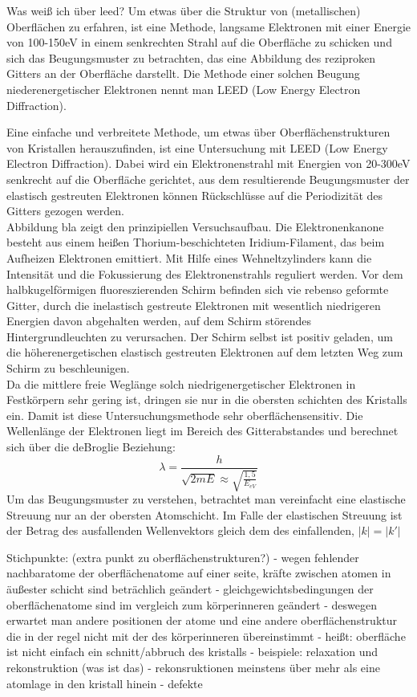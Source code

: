 Was weiß ich über leed?
Um etwas über die Struktur von (metallischen) Oberflächen zu erfahren, ist eine Methode, langsame Elektronen
mit einer Energie von 100-150eV in einem senkrechten Strahl auf die Oberfläche zu schicken und sich das
Beugungsmuster zu betrachten, das eine Abbildung des reziproken Gitters an der Oberfläche darstellt. Die
Methode einer solchen Beugung niederenergetischer Elektronen nennt man LEED (Low Energy Electron Diffraction).
 

 Eine einfache und verbreitete Methode, um etwas über Oberflächenstrukturen von
 Kristallen herauszufinden, ist eine Untersuchung mit LEED (Low Energy Electron
 Diffraction).
 Dabei wird ein Elektronenstrahl mit Energien von 20-300eV senkrecht auf die
 Oberfläche gerichtet, aus dem resultierende Beugungsmuster der elastisch
 gestreuten Elektronen können Rückschlüsse auf die Periodizität des Gitters
 gezogen werden.\\
 Abbildung bla zeigt den prinzipiellen Versuchsaufbau. Die Elektronenkanone
 besteht aus einem heißen Thorium-beschichteten Iridium-Filament, das beim
 Aufheizen Elektronen emittiert. Mit Hilfe eines Wehneltzylinders kann die
 Intensität und die Fokussierung des Elektronenstrahls reguliert werden. Vor dem
 halbkugelförmigen fluoreszierenden Schirm befinden sich vie rebenso geformte
 Gitter, durch die inelastisch gestreute Elektronen mit wesentlich niedrigeren Energien
 davon abgehalten werden, auf dem Schirm störendes Hintergrundleuchten zu
 verursachen. Der Schirm selbst ist positiv geladen, um die höherenergetischen
 elastisch gestreuten Elektronen auf dem letzten Weg zum Schirm zu
 beschleunigen.\\
  Da die mittlere freie Weglänge solch niedrigenergetischer Elektronen in
 Festkörpern sehr gering ist, dringen sie nur in die obersten schichten des
 Kristalls ein. Damit ist diese Untersuchungsmethode sehr oberflächensensitiv.
 Die Wellenlänge der Elektronen liegt im Bereich des Gitterabstandes und
 berechnet sich über die deBroglie Beziehung:
 \[\lambda=\frac{h}{\sqrt{2mE}\approx \sqrt{\frac{1{,}5}{E_{eV}}}}\]
Um das Beugungsmuster zu verstehen, betrachtet man vereinfacht eine elastische
Streuung nur an der obersten Atomschicht. Im Falle der elastischen Streuung ist
der Betrag des ausfallenden Wellenvektors gleich dem des einfallenden,
$|k|=|k'|$
 
 

 
 

 Stichpunkte:
 (extra punkt zu oberflächenstrukturen?)
 - wegen fehlender nachbaratome der oberflächenatome auf einer seite, kräfte zwischen atomen in äußester
 schicht sind beträchlich geändert
 - gleichgewichtsbedingungen der oberflächenatome sind im vergleich zum körperinneren geändert
 - deswegen erwartet man andere positionen der atome und eine andere oberflächenstruktur die in der regel
 nicht mit der des körperinneren übereinstimmt
 - heißt: oberfläche ist nicht einfach ein schnitt/abbruch des kristalls
 - beispiele: relaxation und rekonstruktion (was ist das)
 - rekonsruktionen meinstens über mehr als eine atomlage in den kristall hinein 
 - defekte
 
